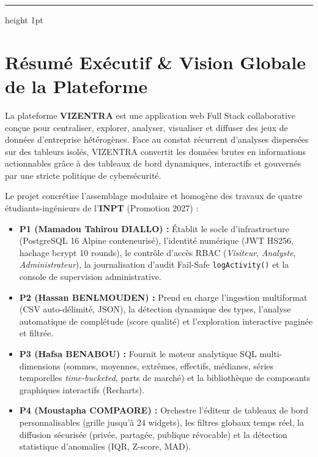 \documentclass[11pt,a4paper]{article}
\begin{document}
\clearpage
\thispagestyle{empty}
\vspace*{0.5cm}
\renewcommand{\contentsname}{\Huge \textbf{\color{brandblue}Sommaire Général}}
\tableofcontents
\vspace{0.8cm}
\hrule height 1pt
\clearpage

\section{Résumé Exécutif \& Vision Globale de la Plateforme}

La plateforme \textbf{VIZENTRA} est une application web Full Stack collaborative conçue pour centraliser, explorer, analyser, visualiser et diffuser des jeux de données d’entreprise hétérogènes. Face au constat récurrent d'analyses dispersées sur des tableurs isolés, VIZENTRA convertit les données brutes en informations actionnables grâce à des tableaux de bord dynamiques, interactifs et gouvernés par une stricte politique de cybersécurité.

Le projet concrétise l'assemblage modulaire et homogène des travaux de quatre étudiants-ingénieurs de l'\textbf{INPT} (Promotion 2027) :
\begin{itemize}[leftmargin=1.5cm, label=\textcolor{techblue}{\textbullet}]
    \item \textbf{P1 (Mamadou Tahirou DIALLO) :} Établit le socle d'infrastructure (PostgreSQL 16 Alpine conteneurisé), l'identité numérique (JWT HS256, hachage bcrypt 10 rounds), le contrôle d'accès RBAC (\textit{Visiteur}, \textit{Analyste}, \textit{Administrateur}), la journalisation d'audit Fail-Safe \texttt{logActivity()} et la console de supervision administrative.
    \item \textbf{P2 (Hassan BENLMOUDEN) :} Prend en charge l'ingestion multiformat (CSV auto-délimité, JSON), la détection dynamique des types, l'analyse automatique de complétude (score qualité) et l'exploration interactive paginée et filtrée.
    \item \textbf{P3 (Hafsa BENABOU) :} Fournit le moteur analytique SQL multi-dimensions (sommes, moyennes, extrêmes, effectifs, médianes, séries temporelles \textit{time-bucketed}, parts de marché) et la bibliothèque de composants graphiques interactifs (Recharts).
    \item \textbf{P4 (Moustapha COMPAORE) :} Orchestre l'éditeur de tableaux de bord personnalisables (grille jusqu'à 24 widgets), les filtres globaux temps réel, la diffusion sécurisée (privée, partagée, publique révocable) et la détection statistique d'anomalies (IQR, Z-score, MAD).
\end{itemize}
\end{document}
